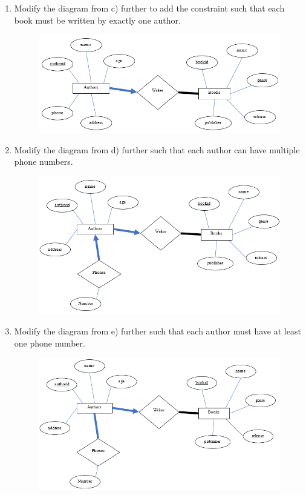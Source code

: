 \documentclass[letterpaper, 11pt]{article}
\begin{document}
\begin{enumerate}[label={\alph*})]
\begin{figure}[H]
    \end{figure}
    \item Modify the diagram from c) further to add the constraint such that each book must be written by exactly one author.
    \begin{figure}[H]
        \centering
        \includegraphics[scale=0.7]{hw2-1d.png}
    \end{figure}
    \item Modify the diagram from d) further such that each author can have multiple phone numbers.
    \begin{figure}[H]
        \centering
        \includegraphics[scale=0.7]{hw2-1e.png}
    \end{figure}
    \item Modify the diagram from e) further such that each author must have at least one phone number.
    \begin{figure}[H]
        \centering
        \includegraphics[scale=0.7]{hw2-1f.png}
    \end{figure}
\end{enumerate}
\end{document}
